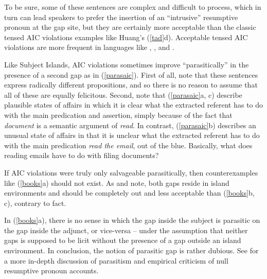 \documentclass[output=paper
 	        ,biblatex
                ,babelshorthands
                ,newtxmath
                ,draftmode
                ,colorlinks, citecolor=brown
]{langscibook}
\begin{document}
\noindent 
To be sure, some of these  sentences are complex and difficult to process,  
which in turn can lead speakers to prefer the insertion of an ``intrusive'' resumptive 
pronoun at the gap site, but they are certainly more acceptable than the 
classic tensed AIC violations examples like Huang's (\ref{tad}d).
Acceptable tensed AIC violations are more frequent in languages like , ,  and .

Like Subject Islands, AIC violations sometimes improve ``parasitically'' in the presence of a second gap as in (\ref{parasaic}). First of all, note that these sentences express radically different propositions, and so there is no reason to assume that all of these are equally felicitous.
Second, note that (\ref{parasaic}a, c) describe plausible  states of affairs in which it is clear what the extracted referent has to do with the main predication and assertion, simply because of the fact that \emph{document}  is a semantic argument of \emph{read}.  In contrast, (\ref{parasaic}b) describes an unusual state of affairs in that  it is unclear what the extracted referent  has to do with the main predication \emph{read the email}, out of the blue. Basically, what does reading emails have to do with filing documents?

\eal \label{parasaic}
\zl

\noindent
If AIC violations were truly only salvageable parasitically, then counterexamples
like (\ref{books}a) should not exist.  As 
\citet{Levine:Sag:03} and
\citet[256]{levhubook}
note, both gaps reside in island environments and should be 
completely out and less acceptable than (\ref{books}b, c), contrary to fact.

\eal  \label{books}
\zl

\noindent
In (\ref{books}a), there is no sense in which the gap inside the subject is parasitic on the gap inside the  adjunct, or vice-versa -- under the assumption that neither gaps is supposed to be licit without  the presence of a gap outside an island environment. In conclusion, the notion of parasitic 
gap is rather dubious. See \citet{levhubook} for a more in-depth discussion of parasitism and 
empirical criticism of null resumptive pronoun accounts.
\end{document}

